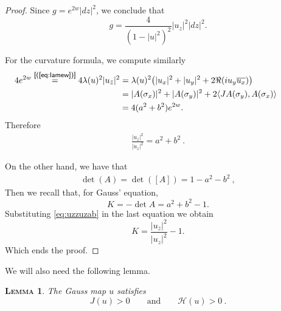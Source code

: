 \documentclass[a4paper,11pt,openright,twoside]{book}
\newcommand{\1}{\mathds{1}}
\newcommand{\commb}[1]{\textsf{{\footnotesize[#1]}}}
\newcommand{\qref}[1]{(\ref{#1})}
\theoremstyle{plain}
\newtheorem{lemma}[thm]{\textsc{Lemma}}
\theoremstyle{definition}
\theoremstyle{remark}
\begin{document}
\begin{proof}
Since $g=e^{2w}|dz|^2$, we conclude that
\[
g=\frac{4}{(1-|u|^2)^2}|u_z|^2|dz|^2.
\]

For the curvature formula, we compute similarly
\begin{align*}
	4e^{2w} \overset{\commb{\qref{eq:lamew}}}{=}   4\lambda(u)^2|u_{\bar z}|^2
&=\lambda(u)^2\bigl(|u_x|^2+|u_y|^2+2\Re(iu_y\overline{u_x})\bigr) \hspace{2cm}\\
&=|A(\sigma_x)|^2+|A(\sigma_y)|^2+2\langle J A(\sigma_y),A(\sigma_x)\rangle\\
&=4(a^2+b^2)e^{2w}.
\end{align*}
Therefore
\begin{align}\label{eq:uzzuzab}
\frac{|u_{\bar z}|^2}{|u_z|^2}=a^2+b^2
\ . 
\end{align}

On the other hand, we have that
 \begin{align*}
	 \det(A) = \det([A]) = 1-a^2-b^2
\ , 
\end{align*}
Then we recall that, for Gauss' equation,
\[
K=-\det A=a^2+b^2-1.
\]
Substituting \ref{eq:uzzuzab} in the last equation we obtain
\[
K=\frac{|u_{\bar z}|^2}{|u_z|^2}-1.
\]
Which ends the proof.
\end{proof}
We will also need the following lemma.
\begin{lemma}\label{cl:jhupos}
	The Gauss map $u$ satisfies  
	\[J(u) > 0\qquad\text{and}\qquad \mathcal H(u)>0\ .\] 
\end{lemma}
\end{document}
